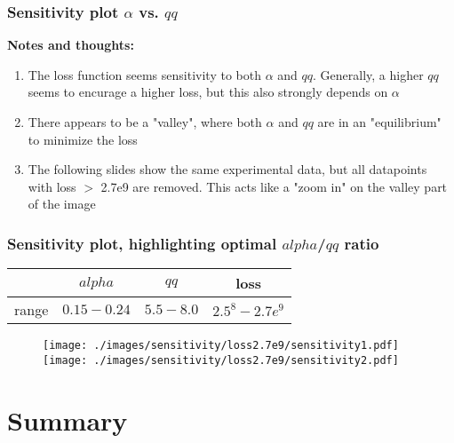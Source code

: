 \documentclass{beamer}
\begin{document}
\begin{frame}
	\frametitle{Sensitivity plot $\alpha$ vs. $qq$}
	\textbf{Notes and thoughts:}
	\begin{enumerate}[$\bullet$]
		\item The loss function seems sensitivity to both $\alpha$ and $qq$. Generally, a higher $qq$ seems to encurage a higher loss, but this also strongly depends on $\alpha$
		\item There appears to be a "valley", where both $\alpha$ and $qq$ are in an "equilibrium" to minimize the loss
		\item The following slides show the same experimental data, but all datapoints with loss $>$ 2.7e9 are removed. This acts like a "zoom in" on the valley part of the image
	\end{enumerate}
\end{frame}

\begin{frame}
	\frametitle{Sensitivity plot, highlighting optimal $alpha$/$qq$ ratio}
	\begin{center}
		\begin{tabular}{|c|c|c|c|}
			\hline & $alpha$ & $qq$ & loss \\
			\hline range & $0.15-0.24$ & $5.5-8.0$ & $2.5^{8}-2.7e^{9}$\\
			\hline
		\end{tabular}
		\begin{figure}
				\hspace{-1.4cm}
				\texttt{[image: ./images/sensitivity/loss2.7e9/sensitivity1.pdf]}\hspace{-1cm}%
				\texttt{[image: ./images/sensitivity/loss2.7e9/sensitivity2.pdf]}
		\end{figure}
	\end{center}
\end{frame}





\section{Summary}
\end{document}
